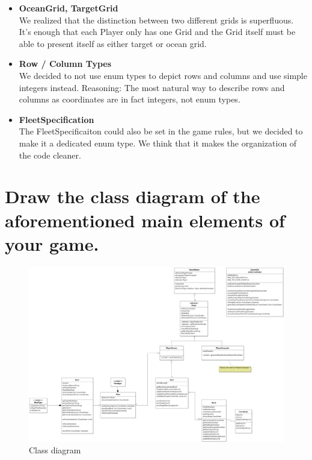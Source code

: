 \documentclass{article}
\begin{document}
\begin{itemize}
    \item \textbf{OceanGrid, TargetGrid}\\
    We realized that the distinction between two different grids is superfluous. It's enough that each Player only has one Grid and the Grid itself must be able to present itself as either target or ocean grid.
    
    \item \textbf{Row / Column Types}\\
    We decided to not use enum types to depict rows and columns and use simple integers instead. Reasoning: The most natural way to describe rows and columns as coordinates are in fact integers, not enum types.
    
    \item \textbf{FleetSpecification}\\
    The FleetSpecificaiton could also be set in the game rules, but we decided to make it a dedicated enum type. We think that it makes the organization of the code cleaner.

\end{itemize}




\newpage
\section{Draw the class diagram of the aforementioned main elements of your game.}
\begin{figure}[h]
\centering
\includegraphics[width = \linewidth]{images/class_diagram.png}
\caption{Class diagram}
\end{figure}
\end{document}
